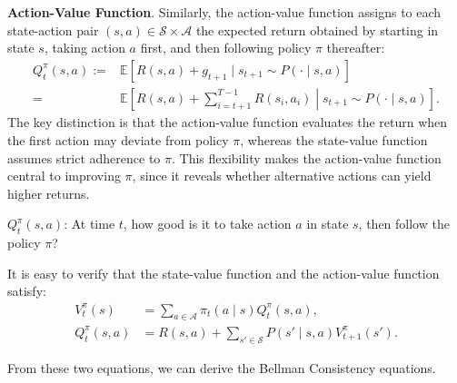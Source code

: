 \documentclass[
]{book}
\theoremstyle{definition}
\theoremstyle{definition}
\theoremstyle{definition}
\theoremstyle{definition}
\theoremstyle{remark}
\begin{document}
\textbf{Action-Value Function}. Similarly, the action-value function assigns to each state-action pair \((s,a)\in\mathcal{S}\times\mathcal{A}\) the expected return obtained by starting in state \(s\), taking action \(a\) first, and then following policy \(\pi\) thereafter:
\begin{equation}
\begin{split}
Q_t^\pi(s,a) := & \mathbb{E} \left[R(s,a) + g_{t+1} \mid s_{t+1} \sim P(\cdot \mid s,a)\right] \\
= & \mathbb{E} \left[R(s,a) + \sum_{i=t+1}^{T-1} R(s_i, a_i) \middle| s_{t+1} \sim P(\cdot \mid s,a) \right].
\end{split}
\label{eq:FiniteHorizonMDP-action-value}
\end{equation}
The key distinction is that the action-value function evaluates the return when the first action may deviate from policy \(\pi\), whereas the state-value function assumes strict adherence to \(\pi\). This flexibility makes the action-value function central to improving \(\pi\), since it reveals whether alternative actions can yield higher returns.

\(Q^{\pi}_t(s,a)\): At time \(t\), how good is it to take action \(a\) in state \(s\), then follow the policy \(\pi\)?

It is easy to verify that the state-value function and the action-value function satisfy:
\begin{align}
V_t^{\pi}(s) & = \sum_{a \in \mathcal{A}} \pi_t(a \mid s) Q_t^{\pi}(s,a), \label{eq:FiniteHorizonMDP-state-value-from-action-value} \\
Q_t^{\pi}(s,a) & = R(s,a) + \sum_{s' \in \mathcal{S}} P(s' \mid s, a) V^{\pi}_{t+1} (s'). \label{eq:FiniteHorizonMDP-action-value-from-state-value}
\end{align}

From these two equations, we can derive the Bellman Consistency equations.
\end{document}
